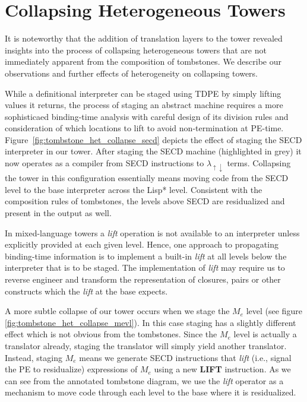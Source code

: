 \documentclass[sigplan,anonymous,review]{acmart}
\newcommand{\mslang}{$\lambda_{\uparrow\downarrow}$}
\newcommand{\mevl}{$M_{e}$}
\theoremstyle{definition}
\begin{document}
\section{Collapsing Heterogeneous Towers}\label{subsec:collapseh}

It is noteworthy that the addition of translation layers to the tower revealed insights into the process of collapsing heterogeneous towers that are not immediately apparent from the composition of tombstones. We describe our observations and further effects of heterogeneity on collapsing towers.

While a definitional interpreter can be staged using TDPE by simply lifting values it returns, the process of staging an abstract machine requires a more sophisticaed binding-time analysis with careful design of its division rules
and consideration of which locations to lift to avoid non-termination at PE-time. Figure~\ref{fig:tombstone_het_collapse_secd} depicts the effect of staging the SECD interpreter in our tower. After staging the SECD machine (highlighted in grey) it now operates as a compiler from SECD instructions to \mslang{} terms. Collapsing the tower in this configuration essentially means moving code from the SECD level to the base interpreter across the Lisp* level. Consistent with the composition rules of tombstones, the levels above SECD are residualized and present in the output as well.

In mixed-language towers a \textit{lift} operation is not available to an interpreter unless explicitly provided at each given level.
Hence, one approach to propagating binding-time information is to implement a built-in \textit{lift} at all levels below the interpreter that is to be staged. The implementation of \textit{lift} may require us to reverse engineer and transform the representation of closures, pairs or other constructs which the \textit{lift} at the base expects.

A more subtle collapse of our tower occurs when we stage the \mevl{} level (see figure \ref{fig:tombstone_het_collapse_mevl}). In this case staging has a slightly different effect which is not obvious from the tombstones. Since the \mevl{} level is actually a translator already, staging the translator will simply yield another translator. Instead, staging \mevl{} means we generate SECD instructions that \textit{lift} (i.e., signal the PE to residualize) expressions of \mevl{} using a new \textbf{LIFT} instruction. As we can see from the annotated tombstone diagram, we use the \textit{lift} operator as a mechanism to move code through each level to the base where it is residualized.
\end{document}
